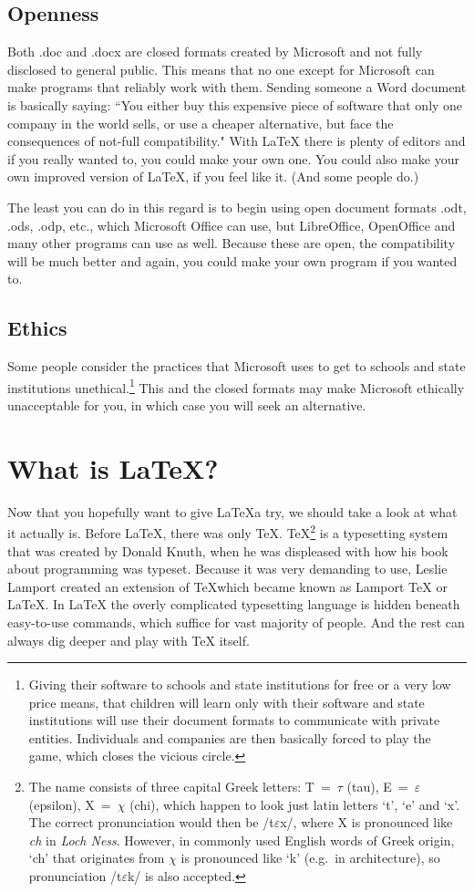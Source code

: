 \documentclass[11pt]{article}
\begin{document}
\subsection{Openness}
Both .doc and .docx are closed formats created by Microsoft and not fully disclosed to general public. This means that no one except for Microsoft can make programs that reliably work with them. Sending someone a Word document is basically saying: ``You either buy this expensive piece of software that only one company in the world sells, or use a cheaper alternative, but face the consequences of not-full compatibility." With LaTeX there is plenty of editors and if you really wanted to, you could make your own one. You could also make your own improved version of LaTeX, if you feel like it. (And some people do.)

The least you can do in this regard is to begin using open document formats .odt, .ods, .odp, etc., which Microsoft Office can use, but LibreOffice, OpenOffice and many other programs can use as well. Because these are open, the compatibility will be much better and again, you could make your own program if you wanted to.
\subsection{Ethics}
Some people consider the practices that Microsoft uses to get to schools and state institutions unethical.\footnote[2]{Giving their software to schools and state institutions for free or a very low price means, that children will learn only with their software and state institutions will use their document formats to communicate with private entities. Individuals and companies are then basically forced to play the game, which closes the vicious circle.} This and the closed formats may make Microsoft ethically unacceptable for you, in which case you will seek an alternative.

\section{What is \LaTeX?}
Now that you hopefully want to give \LaTeX a try, we should take a look at what it actually is. Before \LaTeX, there was only \TeX. TeX\footnote[3]{The name consists of three capital Greek letters: T~=~$\tau$ (tau), E~=~$\varepsilon$ (epsilon), X~=~$\chi$ (chi), which happen to look just latin letters `t', `e' and `x'. The correct pronunciation would then be /t$\varepsilon$x/, where X is pronounced like \emph{ch} in \emph{Loch Ness}. However, in commonly used English words of Greek origin, `ch' that originates from $\chi$ is pronounced like `k' (e.g.~in architecture), so pronunciation /t$\varepsilon$k/ is also accepted.} is a typesetting system that was created by Donald Knuth, when he was displeased with how his book about programming was typeset. Because it was very demanding to use, Leslie Lamport created an extension of \TeX which became known as Lamport TeX or \LaTeX. In LaTeX the overly complicated typesetting language is hidden beneath easy-to-use commands, which suffice for vast majority of people. And the rest can always dig deeper and play with TeX itself.
\end{document}
